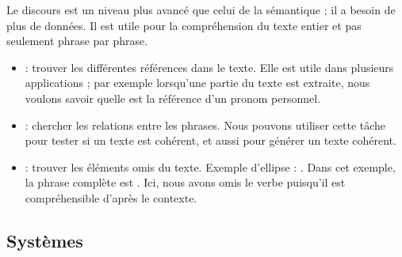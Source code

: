 \documentclass{KodeBook}
\begin{document}
Le discours est un niveau plus avancé que celui de la sémantique ; il a besoin de plus de données. 
Il est utile pour la compréhension du texte entier et pas seulement phrase par phrase.
\begin{itemize}
	\item {} : trouver les différentes références dans le texte. 
	Elle est utile dans plusieurs applications ; par exemple lorsqu'une partie du texte est extraite, nous voulons savoir quelle est la référence d'un pronom personnel.
	\item {} : chercher les relations entre les phrases. 
	Nous pouvons utiliser cette tâche pour tester si un texte est cohérent, et aussi pour générer un texte cohérent.
	\item {} : trouver les éléments omis du texte. 
	Exemple d'ellipse : .
	Dans cet exemple, la phrase complète est .
	Ici, nous avons omis le verbe puisqu'il est compréhensible d'après le contexte.
\end{itemize}

\subsection{Systèmes}
\end{document}

